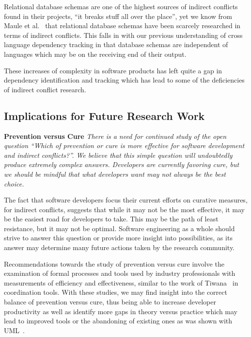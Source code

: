 \documentclass[conference]{IEEEtran}
\begin{document}
Relational database schemas are one of the highest sources of indirect
conflicts found in their projects, ``it breaks stuff all over the place'',
yet we know from Maule et al.~\cite{Maule:2008:IAD} that relational database schemas have
been scarcely researched in terms of indirect conflicts. This falls in with our previous understanding of cross language
dependency tracking in that database schemas are independent of languages which may be on the receiving end of their output.

These increases of complexity in software products has left quite a gap in dependency identification and tracking which
has lead to some of the deficiencies of indirect conflict research.

\subsection{Implications for Future Research Work}
\label{sec:implr}

\textbf{Prevention versus Cure} \textit{There is a need for continued study of the open question
``Which of prevention or cure is more effective for software development and indirect conflicts?''. We believe that this simple question will undoubtedly
produce extremely complex answers. Developers are currently favoring cure, but we should be mindful that what developers want
may not always be the best choice.}

The fact that software developers focus their current efforts on curative measures, for
indirect conflicts, suggests
that while it may not be the most effective, it may be the easiest road for developers to take. This may be the path of
least resistance, but it may not be optimal. Software engineering as a whole should strive to answer this question or
provide more insight into possibilities, as its answer may determine many future actions taken by the research community.

Recommendations towards the study of prevention versus cure involve the examination of formal processes and tools used
by industry professionals with measurements of efficiency and effectiveness, similar to the work of
Tiwana~\cite{Tiwana:2008:ICD} in coordination tools. With these studies, we may find insight into the correct balance
of prevention versus cure, thus being able to increase developer productivity as well as identify more gaps in theory
versus practice which may lead to improved tools or the abandoning of existing ones as was shown with UML~\cite{Petre:2013:UP}.
\end{document}
